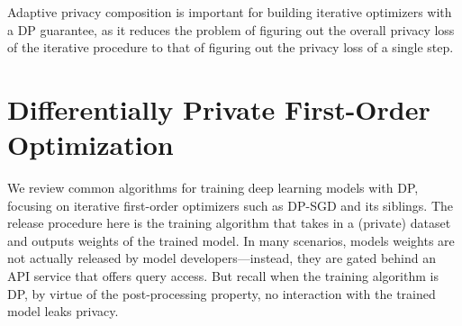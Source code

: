 Adaptive privacy composition is important for building iterative optimizers with a DP guarantee, as it reduces the problem of figuring out the overall privacy loss of the iterative procedure to that of figuring out the privacy loss of a single step.

\section[Differentially Private First-Order Optimization]{\large Differentially Private First-Order Optimization}
\label{sec:dp_first_order}
We review common algorithms for training deep learning models with DP, focusing on iterative first-order optimizers such as DP-SGD and its siblings.
The release procedure here is the training algorithm that takes in a (private) dataset and outputs weights of the trained model.
In many scenarios, models weights are not actually released by model developers---instead, they are gated behind an API service that offers query access.
But recall when the training algorithm is DP, by virtue of the post-processing property, no interaction with the trained model leaks privacy.

